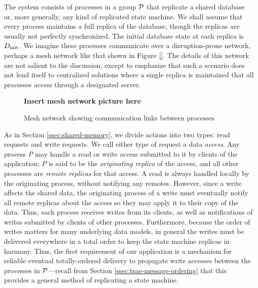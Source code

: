 \documentclass[]             %
{NASA}                       %
\theoremstyle{definition}
\begin{document}

The system consists of processes in a group $\mathcal{P}$ that replicate
a shared database or, more generally, any kind of replicated state
machine. We shall assume that every process maintains a full replica
of the database, though the replicas are usually not perfectly
synchronized. The initial database state at each replica is
$D_\textrm{init}$. We imagine these processes communicate over a
disruption-prone network, perhaps a mesh network like that shown in
Figure \ref{}. The details of this network are not salient to the
discussion, except to emphasize that such a scenario does not lend
itself to centralized solutions where a single replica is maintained
that all processes access through a designated server.

\begin{figure}
  \centering
  \textbf{Insert mesh network picture here}
  \caption{Mesh network showing communication links between processes}
\end{figure}

As in Section \ref{ssec:shared-memory}, we divide actions into two
types: read requests and write requests. We call either type of
request a data \emph{access}. Any process $P$ may handle a read or
write access submitted to it by clients of the application; $P$ is
said to be the \emph{originating replica} of the access, and all other
processes are \emph{remote replicas} for that access. A read is always
handled locally by the originating process, without notifying any
remotes. However, since a write affects the shared data, the
originating process of a write must eventually notify all remote
replicas about the access so they may apply it to their copy of the
data. Thus, each process receives writes from its clients, as well as
notifications of writes submitted by clients of other processes.
Furthermore, because the order of writes matters for many underlying
data models, in general the writes must be delivered everywhere in a
total order to keep the state machine replicas in harmony. Thus, the
first requirement of our application is a mechanism for reliable
eventual totally-ordered delivery to propagate write accesses between
the processes in $\mathcal{P}$---recall from Section
\ref{ssec:tsae-message-ordering} that this provides a general method
of replicating a state machine.
\end{document}
